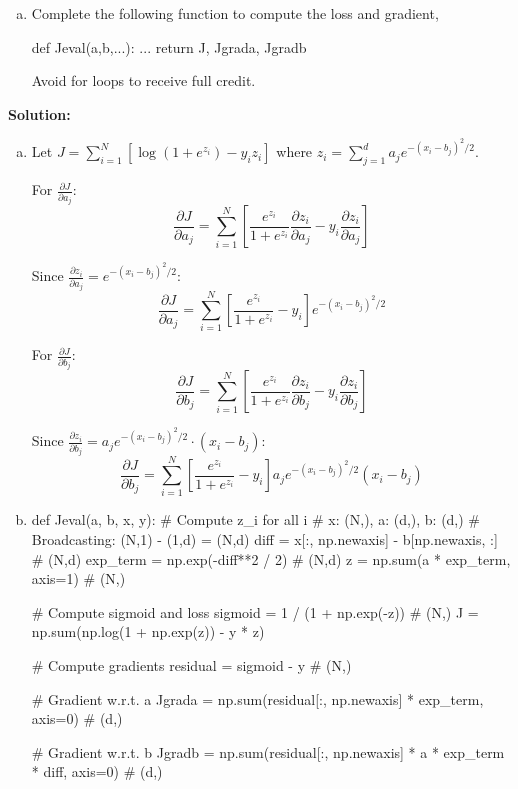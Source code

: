 \documentclass[11pt]{article}
\begin{document}
\begin{enumerate}
\begin{enumerate}[(a)]
\item Complete the following function to compute the loss and gradient,
\begin{python}
    def Jeval(a,b,...):
        ...
        return J, Jgrada, Jgradb
\end{python}
Avoid for loops to receive full credit.
\end{enumerate}

\textbf{Solution:}
\begin{enumerate}[(a)]
\item Let $J = \sum_{i=1}^N [\log(1+e^{z_i}) - y_iz_i]$ where $z_i = \sum_{j=1}^d a_j e^{-(x_i-b_j)^2/2}$.

For $\frac{\partial J}{\partial a_j}$:
$$\frac{\partial J}{\partial a_j} = \sum_{i=1}^N \left[\frac{e^{z_i}}{1+e^{z_i}} \frac{\partial z_i}{\partial a_j} - y_i \frac{\partial z_i}{\partial a_j}\right]$$

Since $\frac{\partial z_i}{\partial a_j} = e^{-(x_i-b_j)^2/2}$:
$$\frac{\partial J}{\partial a_j} = \sum_{i=1}^N \left[\frac{e^{z_i}}{1+e^{z_i}} - y_i\right] e^{-(x_i-b_j)^2/2}$$

For $\frac{\partial J}{\partial b_j}$:
$$\frac{\partial J}{\partial b_j} = \sum_{i=1}^N \left[\frac{e^{z_i}}{1+e^{z_i}} \frac{\partial z_i}{\partial b_j} - y_i \frac{\partial z_i}{\partial b_j}\right]$$

Since $\frac{\partial z_i}{\partial b_j} = a_j e^{-(x_i-b_j)^2/2} \cdot (x_i - b_j)$:
$$\frac{\partial J}{\partial b_j} = \sum_{i=1}^N \left[\frac{e^{z_i}}{1+e^{z_i}} - y_i\right] a_j e^{-(x_i-b_j)^2/2} (x_i - b_j)$$

\item 
\begin{python}
def Jeval(a, b, x, y):
    # Compute z_i for all i
    # x: (N,), a: (d,), b: (d,)
    # Broadcasting: (N,1) - (1,d) = (N,d)
    diff = x[:, np.newaxis] - b[np.newaxis, :]  # (N,d)
    exp_term = np.exp(-diff**2 / 2)  # (N,d)
    z = np.sum(a * exp_term, axis=1)  # (N,)
    
    # Compute sigmoid and loss
    sigmoid = 1 / (1 + np.exp(-z))  # (N,)
    J = np.sum(np.log(1 + np.exp(z)) - y * z)
    
    # Compute gradients
    residual = sigmoid - y  # (N,)
    
    # Gradient w.r.t. a
    Jgrada = np.sum(residual[:, np.newaxis] * exp_term, axis=0)  # (d,)
    
    # Gradient w.r.t. b  
    Jgradb = np.sum(residual[:, np.newaxis] * a * exp_term * diff, axis=0)  # (d,)
    

\end{python}
\end{enumerate}
\end{enumerate}
\end{document}
